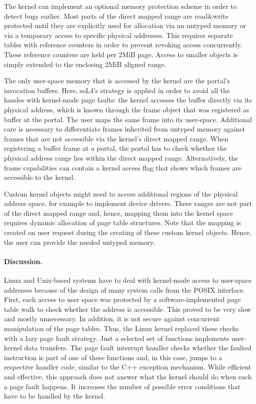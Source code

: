 The kernel can implement an optional memory protection scheme in order to detect bugs earlier. Most parts of the direct mapped range are read\&write protected until they are explicitly used for allocation via an untyped memory or via a temporary access to specific physical addresses. This requires separate tables with reference counters in order to prevent revoking access concurrently. These reference counters are held per 2MiB page. Access to smaller objects is simply extended to the enclosing 2MiB aligned range.

The only user-space memory that is accessed by the kernel are the portal's invocation buffers. Here, seL4's strategy is applied in order to avoid all the hassles with kernel-mode page faults: the kernel accesses the buffer directly via its physical address, which is known through the frame object that was registered as buffer at the portal. The user maps the same frame into its user-space. Additional care is necessary to differentiate frames inherited from untyped memory against frames that are not accessible via the kernel's direct mapped range. When registering a buffer frame at a portal, the portal has to check whether the physical address range lies within the direct mapped range. Alternatively, the frame capabilities can contain a kernel access flag that shows which frames are accessible to the kernel.

Custom kernel objects might need to access additional regions of the physical address space, for example to implement device drivers. These ranges are not part of the direct mapped range and, hence, mapping them into the kernel space requires dynamic allocation of page table structures. Note that the mapping is created on user request during the creating of these custom kernel objects. Hence, the user can provide the needed untyped memory.

\paragraph{Discussion.}
Linux and Unix-based systems have to deal with kernel-mode access to user-space addresses because of the design of many system calls from the POSIX interface. First, each access to user space was protected by a software-implemented page table walk to check whether the address is accessible. This proved to be very slow and mostly unnecessary. In addition, it is not secure against concurrent manipulation of the page tables. Thus, the Linux kernel replaced these checks with a lazy page fault strategy. Just a selected set of functions implements user-kernel data transfers. The page fault interrupt handler checks whether the faulted instruction is part of one of these functions and, in this case, jumps to a respective handler code, similar to the C++ exception mechanism. While efficient and effective, this approach does not answer what the kernel should do when such a page fault happens. It increases the number of possible error conditions that have to be handled by the kernel. 

